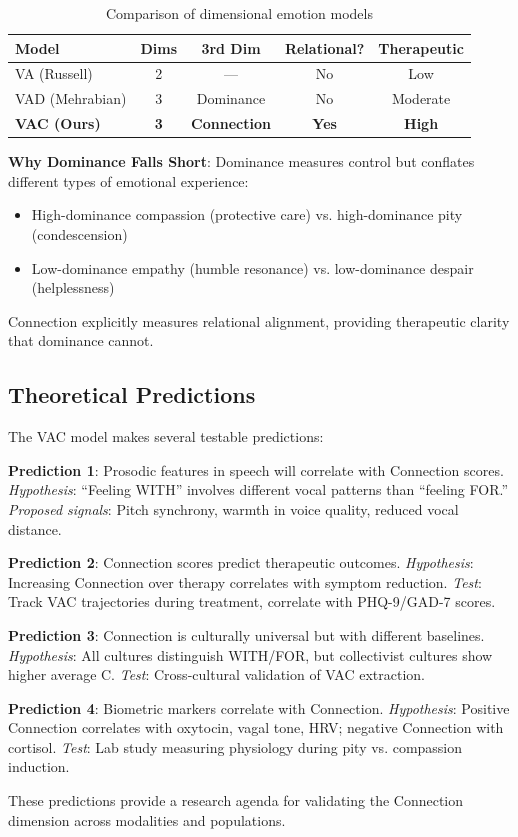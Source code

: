 \begin{table}[h]
\centering
\caption{Comparison of dimensional emotion models}
\label{tab:model-comparison}
\small
\begin{tabular}{lcccc}
\toprule
\textbf{Model} & \textbf{Dims} & \textbf{3rd Dim} & \textbf{Relational?} & \textbf{Therapeutic} \\
\midrule
VA (Russell) & 2 & — & No & Low \\
VAD (Mehrabian) & 3 & Dominance & No & Moderate \\
\textbf{VAC (Ours)} & \textbf{3} & \textbf{Connection} & \textbf{Yes} & \textbf{High} \\
\bottomrule
\end{tabular}
\end{table}

\textbf{Why Dominance Falls Short}: Dominance measures control but conflates different types of emotional experience:
\begin{itemize}
    \item High-dominance compassion (protective care) vs. high-dominance pity (condescension)
    \item Low-dominance empathy (humble resonance) vs. low-dominance despair (helplessness)
\end{itemize}

Connection explicitly measures relational alignment, providing therapeutic clarity that dominance cannot.

\subsection{Theoretical Predictions}

The VAC model makes several testable predictions:

\textbf{Prediction 1}: Prosodic features in speech will correlate with Connection scores. \textit{Hypothesis}: ``Feeling WITH'' involves different vocal patterns than ``feeling FOR.'' \textit{Proposed signals}: Pitch synchrony, warmth in voice quality, reduced vocal distance.

\textbf{Prediction 2}: Connection scores predict therapeutic outcomes. \textit{Hypothesis}: Increasing Connection over therapy correlates with symptom reduction. \textit{Test}: Track VAC trajectories during treatment, correlate with PHQ-9/GAD-7 scores.

\textbf{Prediction 3}: Connection is culturally universal but with different baselines. \textit{Hypothesis}: All cultures distinguish WITH/FOR, but collectivist cultures show higher average C. \textit{Test}: Cross-cultural validation of VAC extraction.

\textbf{Prediction 4}: Biometric markers correlate with Connection. \textit{Hypothesis}: Positive Connection correlates with oxytocin, vagal tone, HRV; negative Connection with cortisol. \textit{Test}: Lab study measuring physiology during pity vs. compassion induction.

These predictions provide a research agenda for validating the Connection dimension across modalities and populations.
